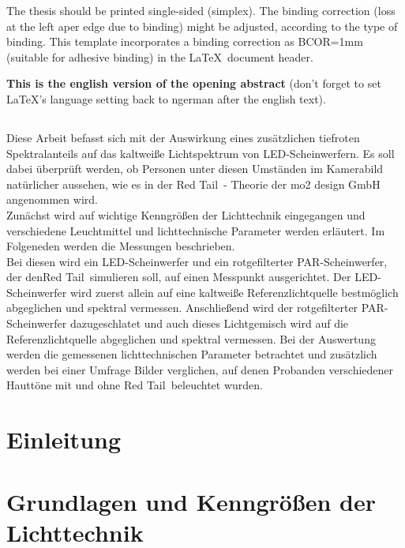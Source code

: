 The thesis should be printed single-sided (simplex). The binding correction (loss at the left aper edge due to binding) might be adjusted, according to the type of binding. This template incorporates a binding correction as BCOR=1mm (suitable for adhesive binding) in the \LaTeX\ document header.

{\bfseries This is the english version of the opening abstract} (don't forget to set \LaTeX's language setting back to ngerman after the english text). 
 
 
\section*{\centering\abstractname}

Diese Arbeit befasst sich mit der Auswirkung eines zusätzlichen tiefroten Spektralanteils auf das kaltweiße Lichtspektrum von LED-Scheinwerfern. Es soll dabei überprüft werden, ob Personen unter diesen Umständen im Kamerabild natürlicher aussehen, wie es in der \glqq Red Tail\grqq\ - Theorie der mo2 design GmbH angenommen wird.\\
Zunächst wird auf wichtige Kenngrößen der Lichttechnik eingegangen und verschiedene Leuchtmittel und lichttechnische Parameter werden erläutert. Im Folgeneden werden die Messungen beschrieben.\\
Bei diesen wird ein LED-Scheinwerfer und ein rotgefilterter PAR-Scheinwerfer, der den\glqq Red Tail\grqq\ simulieren soll, auf einen Messpunkt ausgerichtet. Der LED-Scheinwerfer wird zuerst allein auf eine kaltweiße Referenzlichtquelle bestmöglich abgeglichen und spektral vermessen. Anschließend wird der rotgefilterter PAR-Scheinwerfer dazugeschlatet und auch dieses Lichtgemisch wird auf die Referenzlichtquelle abgeglichen und spektral vermessen. 
Bei der Auswertung werden die gemessenen lichttechnischen Parameter betrachtet und zusätzlich werden bei einer Umfrage Bilder verglichen, auf denen Probanden verschiedener Hauttöne mit und ohne \glqq Red Tail\grqq\ beleuchtet wurden.





\chapter{Einleitung}

\chapter{Grundlagen und Kenngrößen der Lichttechnik} 

